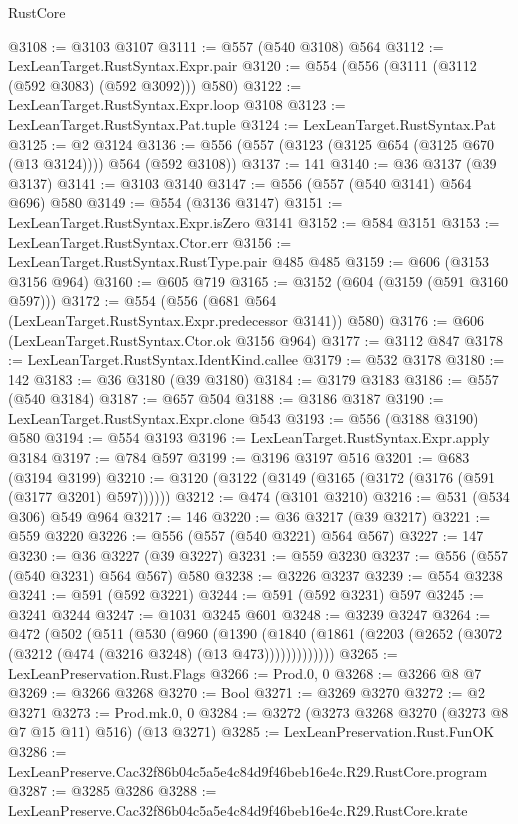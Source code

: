 \begin{lexlean}{RustCore}
\begin{coremodule}
@3108 := @3103 @3107
@3111 := @557 (@540 @3108) @564
@3112 := LexLeanTarget.RustSyntax.Expr.pair
@3120 := @554 (@556 (@3111 (@3112 (@592 @3083) (@592 @3092))) @580)
@3122 := LexLeanTarget.RustSyntax.Expr.loop @3108
@3123 := LexLeanTarget.RustSyntax.Pat.tuple
@3124 := LexLeanTarget.RustSyntax.Pat
@3125 := @2 @3124
@3136 := @556 (@557 (@3123 (@3125 @654 (@3125 @670 (@13 @3124)))) @564 (@592 @3108))
@3137 := 141
@3140 := @36 @3137 (@39 @3137)
@3141 := @3103 @3140
@3147 := @556 (@557 (@540 @3141) @564 @696) @580
@3149 := @554 (@3136 @3147)
@3151 := LexLeanTarget.RustSyntax.Expr.isZero @3141
@3152 := @584 @3151
@3153 := LexLeanTarget.RustSyntax.Ctor.err
@3156 := LexLeanTarget.RustSyntax.RustType.pair @485 @485
@3159 := @606 (@3153 @3156 @964)
@3160 := @605 @719
@3165 := @3152 (@604 (@3159 (@591 @3160 @597)))
@3172 := @554 (@556 (@681 @564 (LexLeanTarget.RustSyntax.Expr.predecessor @3141)) @580)
@3176 := @606 (LexLeanTarget.RustSyntax.Ctor.ok @3156 @964)
@3177 := @3112 @847
@3178 := LexLeanTarget.RustSyntax.IdentKind.callee
@3179 := @532 @3178
@3180 := 142
@3183 := @36 @3180 (@39 @3180)
@3184 := @3179 @3183
@3186 := @557 (@540 @3184)
@3187 := @657 @504
@3188 := @3186 @3187
@3190 := LexLeanTarget.RustSyntax.Expr.clone @543
@3193 := @556 (@3188 @3190) @580
@3194 := @554 @3193
@3196 := LexLeanTarget.RustSyntax.Expr.apply @3184
@3197 := @784 @597
@3199 := @3196 @3197 @516
@3201 := @683 (@3194 @3199)
@3210 := @3120 (@3122 (@3149 (@3165 (@3172 (@3176 (@591 (@3177 @3201) @597))))))
@3212 := @474 (@3101 @3210)
@3216 := @531 (@534 @306) @549 @964
@3217 := 146
@3220 := @36 @3217 (@39 @3217)
@3221 := @559 @3220
@3226 := @556 (@557 (@540 @3221) @564 @567)
@3227 := 147
@3230 := @36 @3227 (@39 @3227)
@3231 := @559 @3230
@3237 := @556 (@557 (@540 @3231) @564 @567) @580
@3238 := @3226 @3237
@3239 := @554 @3238
@3241 := @591 (@592 @3221)
@3244 := @591 (@592 @3231) @597
@3245 := @3241 @3244
@3247 := @1031 @3245 @601
@3248 := @3239 @3247
@3264 := @472
    (@502
      (@511
        (@530
          (@960
            (@1390
              (@1840 (@1861 (@2203 (@2652 (@3072 (@3212 (@474 (@3216 @3248) (@13 @473)))))))))))))
@3265 := LexLeanPreservation.Rust.Flags
@3266 := Prod.{0, 0}
@3268 := @3266 @8 @7
@3269 := @3266 @3268
@3270 := Bool
@3271 := @3269 @3270
@3272 := @2 @3271
@3273 := Prod.mk.{0, 0}
@3284 := @3272 (@3273 @3268 @3270 (@3273 @8 @7 @15 @11) @516) (@13 @3271)
@3285 := LexLeanPreservation.Rust.FunOK
@3286 := LexLeanPreserve.Cac32f86b04c5a5e4c84d9f46beb16e4c.R29.RustCore.program
@3287 := @3285 @3286
@3288 := LexLeanPreserve.Cac32f86b04c5a5e4c84d9f46beb16e4c.R29.RustCore.krate

\end{coremodule}
\end{lexlean}
